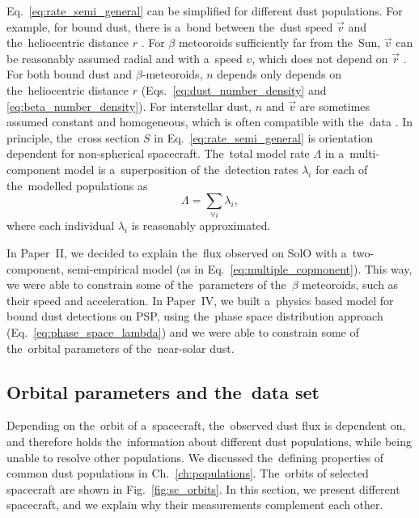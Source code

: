 Eq.~\ref{eq:rate_semi_general} can be simplified for different dust populations. For example, for bound dust, there is a~bond between the~dust speed $\vec{v}$ and the~heliocentric distance $r$ \citep{szalay2020near}. For $\beta$ meteoroids sufficiently far from the~Sun, $\vec{v}$ can be reasonably assumed radial and with a~speed $v$, which does not depend on $\vec{r}$ \citep{zaslavsky2021first}. For both bound dust and $\beta$-meteoroids, $n$ depends only depends on the~heliocentric distance $r$ (Eqs.~\ref{eq:dust_number_density} and \ref{eq:beta_number_density}). For interstellar dust, $n$ and $\vec{v}$ are sometimes assumed constant and homogeneous, which is often compatible with the~data \citep{babic2022situ}. In principle, the~cross section $S$ in Eq.~\ref{eq:rate_semi_general} is orientation dependent for non-spherical spacecraft. 
The~total model rate $\Lambda$ in a~multi-component model is a~superposition of the~detection rates $\lambda_i$ for each of the~modelled populations as
\begin{equation}
    \Lambda = \sum_{\forall i} \lambda_i, \label{eq:multiple_copmonent}
\end{equation}
where each individual $\lambda_i$ is reasonably approximated. 

In Paper~II, we decided to explain the~flux observed on SolO with a~two-component, semi-empirical model (as in Eq.~\ref{eq:multiple_copmonent}). This way, we were able to constrain some of the~parameters of the~$\beta$ meteoroids, such as their speed and acceleration. In Paper~IV, we built a~physics based model for bound dust detections on PSP, using the~phase space distribution approach (Eq.~\ref{eq:phase_space_lambda}) and we were able to constrain some of the~orbital parameters of the~near-solar dust. 

\subsection{Orbital parameters and the~data set}

Depending on the~orbit of a~spacecraft, the~observed dust flux is dependent on, and therefore holds the~information about different dust populations, while being unable to resolve other populations. We discussed the~defining properties of common dust populations in Ch.~\ref{ch:populations}. The~orbits of selected spacecraft are shown in Fig.~\ref{fig:sc_orbits}. In this section, we present different spacecraft, and we explain why their measurements complement each other.  


